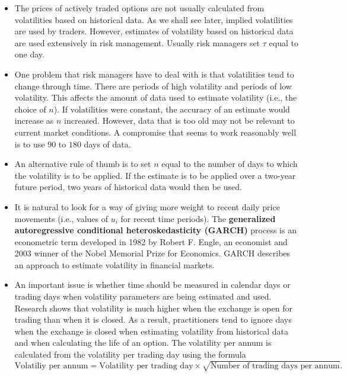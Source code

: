 \documentclass[letterpaper,10pt]{article}
\begin{document}
\begin{itemize} 

\item The prices of actively traded options are not usually calculated from volatilities based on historical data. As we shall see later, implied volatilities are used by traders. However, estimates of volatility based on historical data are used extensively in risk management. Usually risk managers set $\tau$ equal to one day.  

\item One problem that risk managers have to deal with is that volatilities tend to change through time. There are periods of high volatility and periods of low volatility. This affects the amount of data used to estimate volatility (i.e., the choice of $n$). If volatilities were constant, the accuracy of an estimate would increase as $n$ increased. However, data that is too old may not be relevant to current market conditions. A compromise that seems to work reasonably well is to use $90$ to $180$ days of data.

\item An alternative rule of thumb is to set $n$ equal to the number of days to which the volatility is to be applied. If the estimate is to be applied over a two-year future period, two years of historical data would then be used.

\item It is natural to look for a way of giving more weight to recent daily price movements (i.e., values of $u_i$ for recent time periods). The {\bf generalized autoregressive conditional heteroskedasticity (GARCH)} process is an econometric term developed in 1982 by Robert F. Engle, an economist and 2003 winner of the Nobel Memorial Prize for Economics. GARCH describes an approach to estimate volatility in financial markets.

\item An important issue is whether time should be measured in calendar days or trading days when volatility parameters are being estimated and used. Research shows that volatility is much higher when the exchange is open for trading than when it is closed. As a result, practitioners tend to ignore days when the exchange is closed when estimating volatility from historical data and when calculating the life of an option. The volatility per annum is calculated from the volatility per trading day using the formula
 $$\text{Volatiliy per annum}=\text{Volatility per trading day}\times \sqrt{\text{Number of trading days per annum}}.$$
 

\end{itemize}
\end{document}
